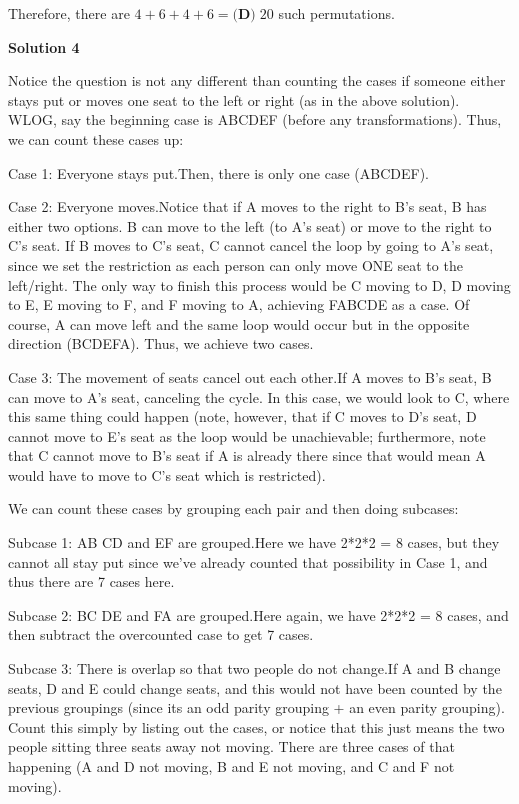\begin{enumerate}
 Therefore, there are $4+6+4+6 = \boxed{\textbf{(D)}\; 20}$ such permutations.

 



\textbf{Solution 4}

Notice the question is not any different than counting the cases if someone either stays put or moves one seat to the left or right (as in the above solution). WLOG, say the beginning case is ABCDEF (before any transformations). Thus, we can count these cases up:

 Case 1: Everyone stays put.Then, there is only one case (ABCDEF).

 Case 2: Everyone moves.Notice that if A moves to the right to B's seat, B has either two options. B can move to the left (to A's seat) or move to the right to C's seat. If B moves to C's seat, C cannot cancel the loop by going to A's seat, since we set the restriction as each person can only move ONE seat to the left/right. The only way to finish this process would be C moving to D, D moving to E, E moving to F, and F moving to A, achieving FABCDE as a case. Of course, A can move left and the same loop would occur but in the opposite direction (BCDEFA). Thus, we achieve two cases.

 Case 3: The movement of seats cancel out each other.If A moves to B's seat, B can move to A's seat, canceling the cycle. In this case, we would look to C, where this same thing could happen (note, however, that if C moves to D's seat, D cannot move to E's seat as the loop would be unachievable; furthermore, note that C cannot move to B's seat if A is already there since that would mean A would have to move to C's seat which is restricted).

 We can count these cases by grouping each pair and then doing subcases:

 Subcase 1: AB CD and EF are grouped.Here we have 2*2*2 = 8 cases, but they cannot all stay put since we've already counted that possibility in Case 1, and thus there are 7 cases here.

 Subcase 2: BC DE and FA are grouped.Here again, we have 2*2*2 = 8 cases, and then subtract the overcounted case to get 7 cases.

 Subcase 3: There is overlap so that two people do not change.If A and B change seats, D and E could change seats, and this would not have been counted by the previous groupings (since its an odd parity grouping + an even parity grouping). Count this simply by listing out the cases, or notice that this just means the two people sitting three seats away not moving. There are three cases of that happening (A and D not moving, B and E not moving, and C and F not moving).


\end{enumerate}

